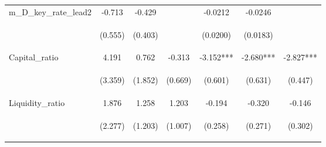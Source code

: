 \documentclass[]{article}
\begin{document}
\begin{center}
\begin{tabular}{lcccccc}
m\_D\_key\_rate\_lead2 & -0.713 & -0.429 &  & -0.0212 & -0.0246 &  \\
\vspace{4pt} & \begin{footnotesize}(0.555)\end{footnotesize} & \begin{footnotesize}(0.403)\end{footnotesize} & \begin{footnotesize}\end{footnotesize} & \begin{footnotesize}(0.0200)\end{footnotesize} & \begin{footnotesize}(0.0183)\end{footnotesize} & \begin{footnotesize}\end{footnotesize} \\
Capital\_ratio & 4.191 & 0.762 & -0.313 & -3.152*** & -2.680*** & -2.827*** \\
\vspace{4pt} & \begin{footnotesize}(3.359)\end{footnotesize} & \begin{footnotesize}(1.852)\end{footnotesize} & \begin{footnotesize}(0.669)\end{footnotesize} & \begin{footnotesize}(0.601)\end{footnotesize} & \begin{footnotesize}(0.631)\end{footnotesize} & \begin{footnotesize}(0.447)\end{footnotesize} \\
Liquidity\_ratio & 1.876 & 1.258 & 1.203 & -0.194 & -0.320 & -0.146 \\
\vspace{4pt} & \begin{footnotesize}(2.277)\end{footnotesize} & \begin{footnotesize}(1.203)\end{footnotesize} & \begin{footnotesize}(1.007)\end{footnotesize} & \begin{footnotesize}(0.258)\end{footnotesize} & \begin{footnotesize}(0.271)\end{footnotesize} & \begin{footnotesize}(0.302)\end{footnotesize} \\

\end{tabular}
\end{center}
\end{document}
